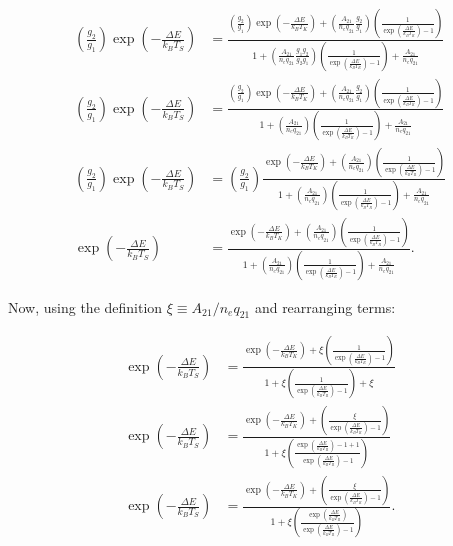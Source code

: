 \documentclass[12pt]{article}
\begin{document}
\begin{equation*}
\begin{split}
\left(\frac{g_2}{g_1}\right)\exp\left(-\frac{\Delta E}{k_BT_S}\right) &= \frac{ \left(\frac{g_2}{g_1}\right)\exp\left(-\frac{\Delta E}{k_BT_K}\right) + \left(\frac{A_{21}}{n_eq_{21}}\frac{g_2}{g_1}\right)\left(\frac{1}{\exp\left(\frac{\Delta E}{k_BT_R}\right)-1}\right) }{1 + \left(\frac{A_{21}}{n_eq_{21}}\frac{g_1g_2}{g_2g_1}\right)\left(\frac{1}{\exp\left(\frac{\Delta E}{k_BT_R}\right)-1}\right) + \frac{A_{21}}{n_eq_{21}}}\\
\left(\frac{g_2}{g_1}\right)\exp\left(-\frac{\Delta E}{k_BT_S}\right) &= \frac{ \left(\frac{g_2}{g_1}\right)\exp\left(-\frac{\Delta E}{k_BT_K}\right) + \left(\frac{A_{21}}{n_eq_{21}}\frac{g_2}{g_1}\right)\left(\frac{1}{\exp\left(\frac{\Delta E}{k_BT_R}\right)-1}\right) }{1 + \left(\frac{A_{21}}{n_eq_{21}}\right)\left(\frac{1}{\exp\left(\frac{\Delta E}{k_BT_R}\right)-1}\right) + \frac{A_{21}}{n_eq_{21}}}\\
\left(\frac{g_2}{g_1}\right)\exp\left(-\frac{\Delta E}{k_BT_S}\right) &= \left(\frac{g_2}{g_1}\right) \frac{\exp\left(-\frac{\Delta E}{k_BT_K}\right) + \left(\frac{A_{21}}{n_eq_{21}}\right)\left(\frac{1}{\exp\left(\frac{\Delta E}{k_BT_R}\right)-1}\right) }{1 + \left(\frac{A_{21}}{n_eq_{21}}\right)\left(\frac{1}{\exp\left(\frac{\Delta E}{k_BT_R}\right)-1}\right) + \frac{A_{21}}{n_eq_{21}}}\\
\exp\left(-\frac{\Delta E}{k_BT_S}\right) &= \frac{\exp\left(-\frac{\Delta E}{k_BT_K}\right) + \left(\frac{A_{21}}{n_eq_{21}}\right)\left(\frac{1}{\exp\left(\frac{\Delta E}{k_BT_R}\right)-1}\right) }{1 + \left(\frac{A_{21}}{n_eq_{21}}\right)\left(\frac{1}{\exp\left(\frac{\Delta E}{k_BT_R}\right)-1}\right) + \frac{A_{21}}{n_eq_{21}}}.
\end{split}
\end{equation*}

Now, using the definition $\xi \equiv A_{21}/n_eq_{21}$ and rearranging terms:

\begin{equation*}
\begin{split}
\exp\left(-\frac{\Delta E}{k_BT_S}\right) &= \frac{\exp\left(-\frac{\Delta E}{k_BT_K}\right) + \xi\left(\frac{1}{\exp\left(\frac{\Delta E}{k_BT_R}\right)-1}\right) }{1 + \xi\left(\frac{1}{\exp\left(\frac{\Delta E}{k_BT_R}\right)-1}\right) + \xi}\\
\exp\left(-\frac{\Delta E}{k_BT_S}\right) &= \frac{\exp\left(-\frac{\Delta E}{k_BT_K}\right) + \left(\frac{\xi}{\exp\left(\frac{\Delta E}{k_BT_R}\right)-1}\right) }{1 + \xi\left(\frac{\exp\left(\frac{\Delta E}{k_BT_R}\right)-1+1}{\exp\left(\frac{\Delta E}{k_BT_R}\right)-1}\right)}\\
\exp\left(-\frac{\Delta E}{k_BT_S}\right) &= \frac{\exp\left(-\frac{\Delta E}{k_BT_K}\right) + \left(\frac{\xi}{\exp\left(\frac{\Delta E}{k_BT_R}\right)-1}\right) }{1 + \xi\left(\frac{\exp\left(\frac{\Delta E}{k_BT_R}\right)}{\exp\left(\frac{\Delta E}{k_BT_R}\right)-1}\right)}.
\end{split}
\end{equation*}
\end{document}
